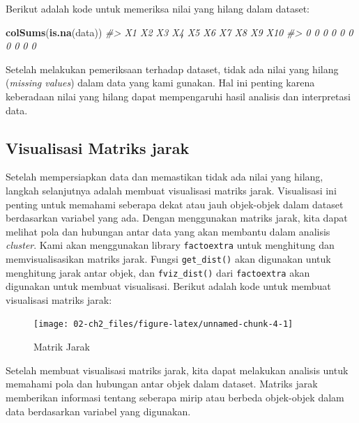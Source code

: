 \documentclass[
  oneside]{book}
\newenvironment{Shaded}{\begin{snugshade}}{\end{snugshade}}
\newcommand{\CommentTok}[1]{\textcolor[rgb]{0.56,0.35,0.01}{\textit{#1}}}
\newcommand{\FunctionTok}[1]{\textcolor[rgb]{0.13,0.29,0.53}{\textbf{#1}}}
\newcommand{\NormalTok}[1]{#1}
\begin{document}
Berikut adalah kode untuk memeriksa nilai yang hilang dalam dataset:

\begin{Shaded}
\begin{Highlighting}[]
\FunctionTok{colSums}\NormalTok{(}\FunctionTok{is.na}\NormalTok{(data))}
\CommentTok{\#\textgreater{}  X1  X2  X3  X4  X5  X6  X7  X8  X9 X10 }
\CommentTok{\#\textgreater{}   0   0   0   0   0   0   0   0   0   0}
\end{Highlighting}
\end{Shaded}

Setelah melakukan pemeriksaan terhadap dataset, tidak ada nilai yang hilang (\emph{missing values}) dalam data yang kami gunakan. Hal ini penting karena keberadaan nilai yang hilang dapat mempengaruhi hasil analisis dan interpretasi data.

\subsection*{Visualisasi Matriks jarak}\label{visualisasi-matriks-jarak}

Setelah mempersiapkan data dan memastikan tidak ada nilai yang hilang, langkah selanjutnya adalah membuat visualisasi matriks jarak. Visualisasi ini penting untuk memahami seberapa dekat atau jauh objek-objek dalam dataset berdasarkan variabel yang ada. Dengan menggunakan matriks jarak, kita dapat melihat pola dan hubungan antar data yang akan membantu dalam analisis \emph{cluster}. Kami akan menggunakan library \texttt{factoextra} untuk menghitung dan memvisualisasikan matriks jarak. Fungsi \texttt{get\_dist()} akan digunakan untuk menghitung jarak antar objek, dan \texttt{fviz\_dist()} dari \texttt{factoextra} akan digunakan untuk membuat visualisasi. Berikut adalah kode untuk membuat visualisasi matriks jarak:

\begin{figure}[h]

{\centering \texttt{[image: 02-ch2\_files/figure-latex/unnamed-chunk-4-1]} 

}

\caption{Matrik Jarak}\label{fig:unnamed-chunk-4}
\end{figure}

Setelah membuat visualisasi matriks jarak, kita dapat melakukan analisis untuk memahami pola dan hubungan antar objek dalam dataset. Matriks jarak memberikan informasi tentang seberapa mirip atau berbeda objek-objek dalam data berdasarkan variabel yang digunakan.
\end{document}

